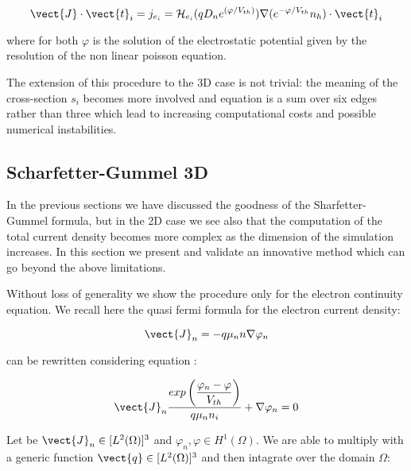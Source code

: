 \begin{equation}
\vect{J}\cdot \vect{t}_i = j_{e_i}  = \mathcal{H}_{e_i}(qD_n e^{(\varphi/V_{th})}) \nabla (e^{-\varphi / V_{th}}n_h) \cdot \vect{t}_i
\end{equation}

where for both $\varphi$ is the solution of the electrostatic potential given by the resolution of the non linear poisson equation.

The extension of this procedure to the 3D case is not trivial: the meaning of the cross-section $s_i$ becomes more involved and equation  is a sum over six edges rather than three which lead to increasing computational costs and possible numerical instabilities.


\subsection{Scharfetter-Gummel 3D}
\label{sec: SG 3D} 
 
In the previous sections we have discussed the goodness of the Sharfetter-Gummel formula, but in the 2D case we see also that the computation of the total current density becomes more complex as the dimension of the simulation increases. In this section we present and validate an innovative method which can go beyond the above limitations.

Without loss of generality we show the procedure only for the electron continuity equation.
We recall here the quasi fermi formula for the electron current density:

\begin{equation}
\label{eq: current density fermi}
\vect{J}_n=-q \mu_n n \nabla \varphi_n
\end{equation}

 can be rewritten considering equation :

\begin{equation}
\label{eq: current density canonic form}
\vect{J}_n\dfrac{ exp\left(\dfrac{\varphi_n-\varphi}{V_{th}}\right)}{q \mu_n n_i} + \nabla \varphi_n = 0
\end{equation}

Let be $\vect{J}_n\in[L^2(\Omega)]^3$ and $\varphi_n,\varphi \in H^1(\Omega)$. We are able to multiply  with a generic function $\vect{q}\in[L^2(\Omega)]^3$ and then intagrate over the domain $\Omega$:

